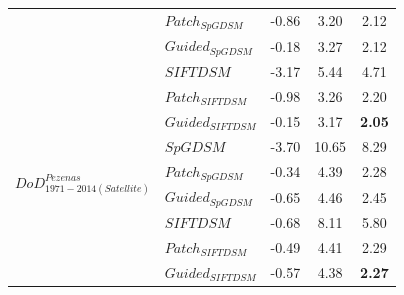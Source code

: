 \begin{table}
\begin{tabular}{||l|l|c|c|c||}
		&${Patch_{SpGDSM}}$ & -0.86 & 3.20 & 2.12\\
		&${Guided_{SpGDSM}}$ & -0.18 & 3.27 & 2.12\\
		&${{SIFTDSM}}$ & -3.17 & 5.44 & 4.71\\
		&${Patch_{SIFTDSM}}$ & -0.98 & 3.26 & 2.20\\
		&${Guided_{SIFTDSM}}$ & -0.15 & 3.17 & \textbf{2.05}\\\hline
		
		\multirow{4}{*}{$DoD^{Pezenas}_{1971-2014(Satellite)}$}
		&${{SpGDSM}}$ & -3.70 & 10.65 & 8.29\\
		&${Patch_{SpGDSM}}$ & -0.34 & 4.39 & 2.28\\
		&${Guided_{SpGDSM}}$ & -0.65 & 4.46 & 2.45\\
		&${{SIFTDSM}}$ & -0.68 & 8.11 & 5.80\\
		&${Patch_{SIFTDSM}}$ & -0.49 & 4.41 & 2.29\\
		&${Guided_{SIFTDSM}}$ & -0.57 & 4.38 & \textbf{2.27}\\\hline
		
		
		
		

\end{tabular}
\end{table}
